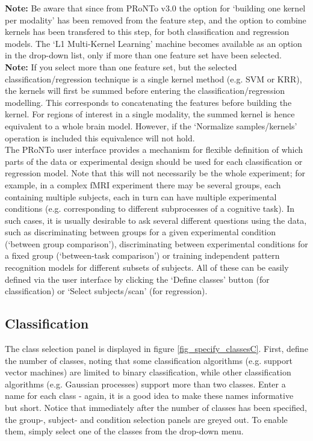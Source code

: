 \textbf{Note:} Be aware that since from PRoNTo v3.0 the option for `building one kernel per modality' has been removed from the feature step, and the option to combine kernels has been transfered to this step, for both classification and regression models. The `L1 Multi-Kernel Learning' machine becomes available as an option in the drop-down list, only if more than one feature set have been selected.
\\

\textbf{Note:} If you select more than one feature set, but the selected classification/regression technique is a single kernel method (e.g. SVM or KRR), the kernels will first be summed before entering the classification/regression modelling. This corresponds to concatenating the features before building the kernel. For regions of interest in a single modality, the summed kernel is hence equivalent to a whole brain model. However, if the `{\color{black}Normalize samples/kernels'} operation is included this equivalence will not hold.
\\

The PRoNTo user interface provides a mechanism for flexible definition of which parts of the data or experimental design should be used for each classification or regression model. Note that this will not necessarily be the whole experiment; for example, in a complex fMRI experiment there may be several groups, each containing multiple subjects, each in turn can have multiple experimental conditions (e.g. corresponding to different subprocesses of a cognitive task). In such cases, it is usually desirable to ask several different questions using the data, such as discriminating between groups for a given experimental condition (`between group comparison'), discriminating between experimental conditions for a fixed group (`between-task comparison') or training independent pattern recognition models for different subsets of subjects. All of these can be easily defined via the user interface by clicking the `Define classes' button (for classification) or `Select subjects/scan' (for regression).

\subsection{Classification}
\label{ssec:ch4_class}

The class selection panel is displayed in figure \ref{fig_specify_classesC}. First, define the number of classes, noting that some classification algorithms (e.g. support vector machines) are limited to binary classification, while other classification algorithms (e.g. Gaussian processes) support more than two classes. Enter a name for each class - again, it is a good idea to make these names informative but short. Notice that immediately after the number of classes has been specified, the group-, subject- and condition selection panels are greyed out. To enable them, simply select one of the classes from the drop-down menu.
\\

